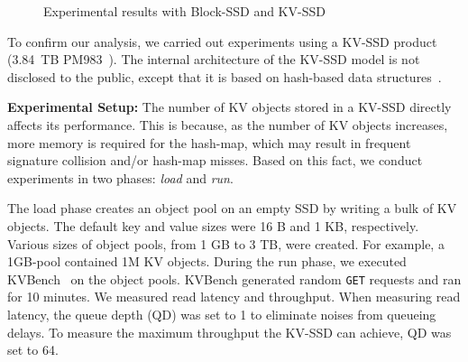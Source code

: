 \documentclass{abstract_hutech}
\begin{document}
\begin{figure}[t]
    \centering
    \caption{Experimental results with Block-SSD and KV-SSD}
    \label{fig:hash-kvssd-exp}\vspace{-13pt}
\end{figure}
To confirm our analysis, we carried out experiments using a KV-SSD product
(3.84~TB PM983~\cite{pm983,kv-pm983}). The internal architecture of the
KV-SSD model is not disclosed to the public, except that it is based on
hash-based data structures~\cite{kvssd}.

\textbf{Experimental Setup:}
The number of KV objects stored in a KV-SSD  directly affects its performance. 
This is because, as the number of KV objects increases, more memory is required for the hash-map, which may result in frequent signature collision and/or hash-map misses.  
Based on this fact, we conduct experiments in two phases: \textit{load} and \textit{run}. 

The load phase creates an object pool on an empty SSD by writing a bulk of KV objects.
The default key and value sizes were 16 B and 1 KB, respectively.
Various sizes of object pools, from 1 GB to 3 TB, were created. 
For example, a 1GB-pool contained 1M KV objects.
During the run phase, we executed KVBench~\cite{kvbench} on the object pools.
KVBench generated random \texttt{GET} requests and ran for 10 minutes. 
We measured read latency and throughput.
When measuring read latency, the queue depth (QD) was set to 1
to eliminate noises from queueing delays. To measure the maximum throughput the
KV-SSD can achieve, QD was set to 64.
\end{document}
